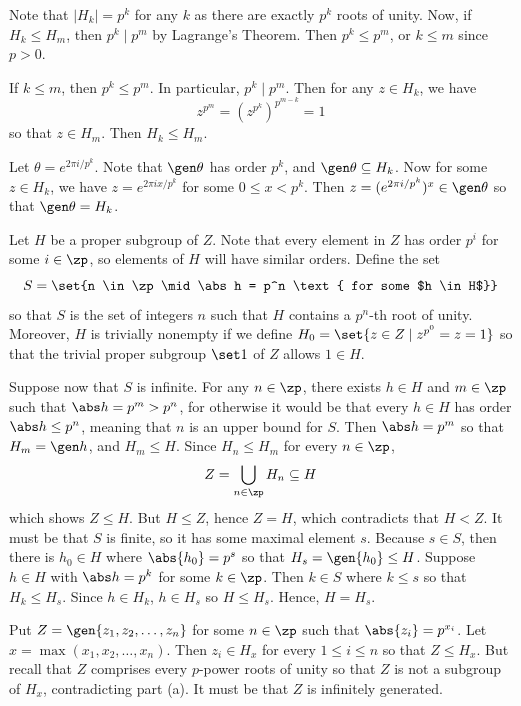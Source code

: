 \begin{solenum}
    \item Note that $|H_k| = p^k$ for any $k$ as there are exactly $p^k$ roots of unity.
	Now, if $H_k \leq H_m$, then $p^k \mid p^m$ by Lagrange's Theorem.
	Then $p^k \leq p^m$, or $k \leq m$ since $p > 0$.
    
    If $k \leq m$, then $p^k \leq p^m$.
	In particular, $p^k \mid p^m$.
	Then for any $z \in H_k$, we have
    \[
    	z^{p^m} = (z^{p^k})^{p^{m - k}} = 1
    \]
    so that $z \in H_m$.
	Then $H_k \leq H_m$.
    \item Let $\theta = e^{2\pi i/p^k}$.
	Note that $\gen\theta$ has order $p^k$, and $\gen\theta \subseteq H_k$.
	Now for some $z \in H_k$, we have $z = e^{2\pi ix/p^k}$ for some $0 \leq x < p^k$.
	Then $z = (e^{2\pi i/p^k})^x \in \gen\theta$ so that $\gen\theta = H_k$.
    \item Let $H$ be a proper subgroup of $Z$.
	Note that every element in $Z$ has order $p^i$ for some $i \in \zp$, so elements of $H$ will have similar orders.
	Define the set
    \[
    	S = \set{n \in \zp \mid \abs h = p^n \text{ for some $h \in H$}}
    \]
    so that $S$ is the set of integers $n$ such that $H$ contains a $p^n$-th root of unity.
	Moreover, $H$ is trivially nonempty if we define $H_0 = \set{z \in Z \mid z^{p^0} = z = 1}$ so that the trivial proper subgroup $\set 1$ of $Z$ allows $1 \in H$.
    
    Suppose now that $S$ is infinite.
	For any $n \in \zp$, there exists $h \in H$ and $m \in \zp$ such that $\abs h = p^m > p^n$, for otherwise it would be that every $h \in H$ has order $\abs h \leq p^n$, meaning that $n$ is an upper bound for $S$.
	Then $\abs h = p^m$ so that $H_m = \gen h$, and $H_m \leq H$.
	Since $H_n \leq H_m$ for every $n \in \zp$,
    \[
    	Z = \bigcup_{n \in \zp} H_n \subseteq H
    \]
    which shows $Z \leq H$.
	But $H \leq Z$, hence $Z = H$, which contradicts that $H < Z$.
	It must be that $S$ is finite, so it has some maximal element $s$.
	Because $s \in S$, then there is $h_0 \in H$ where $\abs{h_0} = p^s$ so that $H_s = \gen{h_0} \leq H$.
	Suppose $h \in H$ with $\abs h = p^k$ for some $k \in \zp$.
	Then $k \in S$ where $k \leq s$ so that $H_k \leq H_s$.
	Since $h \in H_k$, $h \in H_s$ so $H \leq H_s$.
	Hence, $H = H_s$.
    \item Put $Z = \gen{z_1, z_2, \ldots, z_n}$ for some $n \in \zp$ such that $\abs{z_i} = p^{x_i}$.
	Let $x = \max(x_1, x_2, \ldots, x_n)$.
	Then $z_i \in H_x$ for every $1 \leq i \leq n$ so that $Z \leq H_x$.
	But recall that $Z$ comprises every $p$-power roots of unity so that $Z$ is not a subgroup of $H_x$, contradicting part (a).
	It must be that $Z$ is infinitely generated.
\end{solenum}

